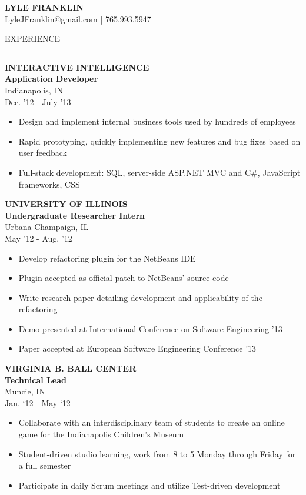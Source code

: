 \documentclass[a4paper,10pt]{article}
\newcommand{\name}[1]{\textbf{\huge{#1}}}
\newcommand{\header}[1]
{
{\Large{\uppercase{#1}}}
\vspace{0.05in}
\hrule
\vspace{0.15in}
}
\newenvironment{details}
{\begin{itemize}[label=\Squarepipe,leftmargin=0.2in]}
{\end{itemize}}
\begin{document}
\name{LYLE FRANKLIN}\\
\indent
LyleJFranklin@gmail.com | 765.993.5947

\vspace{0.2in}

\begin{minipage}[t]{0.55\textwidth}
\header{Experience}

\textbf{INTERACTIVE INTELLIGENCE\\Application Developer}\\
Indianapolis, IN\\
Dec. '12 - July '13

\begin{details}
  \item Design and implement internal business tools used by hundreds of employees
  \item Rapid prototyping, quickly implementing new features and bug fixes based on user feedback
  \item Full-stack development: SQL, server-side ASP.NET MVC and C\#, JavaScript frameworks, CSS
\end{details}


\textbf{UNIVERSITY OF ILLINOIS\\Undergraduate Researcher Intern}\\
Urbana-Champaign, IL\\
May '12 - Aug. '12

\begin{details}
  \item Develop refactoring plugin for the NetBeans IDE
  \item Plugin accepted as official patch to NetBeans’ source code
  \item Write research paper detailing development and applicability of the refactoring
  \item Demo presented at International Conference on Software Engineering '13
  \item Paper accepted at European Software Engineering Conference '13
\end{details}

\textbf{VIRGINIA B. BALL CENTER\\Technical Lead}\\
Muncie, IN\\
Jan. ‘12 - May ‘12

\begin{details}
  \item Collaborate with an interdisciplinary team of students to create
an online game for the Indianapolis Children’s Museum
  \item Student-driven studio learning, work from 8 to 5 Monday
through Friday for a full semester
  \item Participate in daily Scrum meetings and utilize Test-driven
development
\end{details}


\end{minipage}
\end{document}
